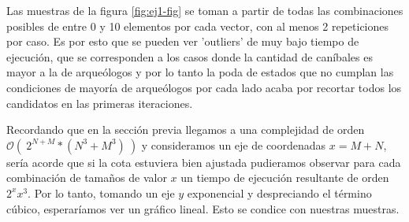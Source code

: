 Las muestras de la figura \ref{fig:ej1-fig} se toman a partir de todas las combinaciones posibles de entre 0 y 10 elementos por cada vector, con al menos 2 repeticiones por caso. Es por esto que se pueden ver 'outliers' de muy bajo tiempo de ejecución, que se corresponden a los casos donde la cantidad de caníbales es mayor a la de arqueólogos y por lo tanto la poda de estados que no cumplan las condiciones de mayoría de arqueólogos por cada lado acaba por recortar todos los candidatos en las primeras iteraciones. 

Recordando que en la sección previa llegamos a una complejidad de orden $ \mathcal{O}(\ 2^{N+M}*(N^3+M^3)\ )$ y consideramos un eje de coordenadas $x = M + N$, sería acorde que si la cota estuviera bien ajustada pudieramos observar para cada combinación de tamaños de valor $x$ un tiempo de ejecución resultante de orden $ 2^{x}x^3 $. Por lo tanto, tomando un eje $y$ exponencial y despreciando el término cúbico, esperaríamos ver un gráfico lineal. Esto se condice con nuestras muestras.

